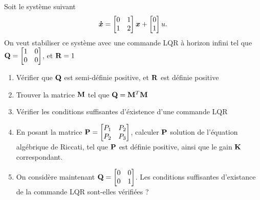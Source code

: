 \begin{exercise}
	Soit le système suivant 
	\begin{equation}
	\bm{\dot{x}} = \begin{bmatrix}
	0 & 1 \\ 1 & 2
	\end{bmatrix} \bm{x}+ \begin{bmatrix}
	0 \\ 1
	\end{bmatrix}u.
	\end{equation}
	On veut stabiliser ce système avec une commande LQR à horizon infini tel que $\mathbf{Q} = \begin{bmatrix}
	1 & 0 \\ 0 &0 
	\end{bmatrix}$, et $\mathbf{R}=1$
	\begin{enumerate}
		\item Vérifier que $\mathbf{Q}$ est semi-définie positive, et $\mathbf{R}$ est définie positive
		\item Trouver la matrice $\mathbf{M}$ tel que $\mathbf{Q} = \mathbf{M}^T\mathbf{M}$
		\item Vérifier les conditions suffisantes d'éxistence d'une commande LQR
		\item En posant la matrice $\mathbf{P}=\begin{bmatrix}
		P_1 & P_2 \\ P_2 & P_3
		\end{bmatrix}$, calculer $\mathbf{P}$ solution de l'équation algébrique de Riccati, tel que $\mathbf{P}$ est définie positive, ainsi que le gain $\mathbf{K}$ correspondant.
		\item On considère maintenant $\mathbf{Q} = \begin{bmatrix}
		0 & 0 \\ 0 &1 
		\end{bmatrix}$. Les conditions suffisantes d'existance de la commande LQR sont-elles vérifiées ?
	\end{enumerate}
\end{exercise}
